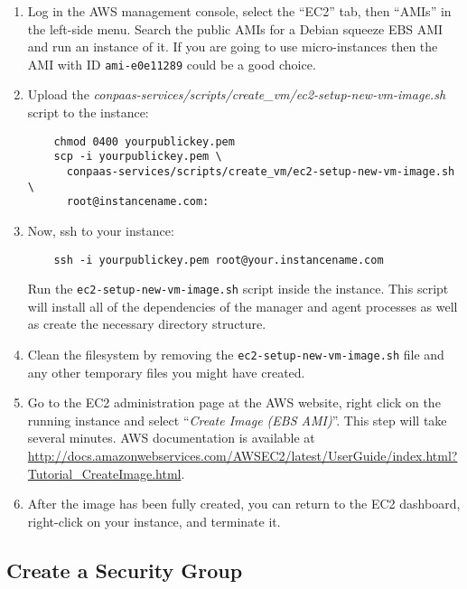 \documentclass[10pt]{article}
\begin{document}
\begin{enumerate}
\item Log in the AWS management console, select the ``EC2'' tab, then
  ``AMIs'' in the left-side menu. Search the public AMIs for a Debian
  squeeze EBS AMI and run an instance of it. If you are going to use
  micro-instances then the AMI with ID \verb+ami-e0e11289+ could be a
  good choice.

\item Upload the \textit{conpaas-services/scripts/create\_vm/ec2-setup-new-vm-image.sh} script to the instance:
  \begin{verbatim}
    chmod 0400 yourpublickey.pem
    scp -i yourpublickey.pem \
      conpaas-services/scripts/create_vm/ec2-setup-new-vm-image.sh \
      root@instancename.com:
  \end{verbatim}

\item Now, ssh to your instance:
  \begin{verbatim}
    ssh -i yourpublickey.pem root@your.instancename.com
  \end{verbatim}
  Run the \verb+ec2-setup-new-vm-image.sh+ script inside the instance.
  This script will install all of the dependencies of the manager and
  agent processes as well as create the necessary directory structure.

\item Clean the filesystem by removing the
  \verb+ec2-setup-new-vm-image.sh+ file and any other temporary files you might
  have created.

\item Go to the EC2 administration page at the AWS website, right
  click on the running instance and select ``\emph{Create Image (EBS
    AMI)}''.  This step will take several minutes. AWS documentation
  is available at
  \url{http://docs.amazonwebservices.com/AWSEC2/latest/UserGuide/index.html?Tutorial\_CreateImage.html}.

\item After the image has been fully created, you can return to the
  EC2 dashboard, right-click on your instance, and terminate it.
\end{enumerate}

\subsection{Create a Security Group}
\label{sec:secgroup}
\end{document}
